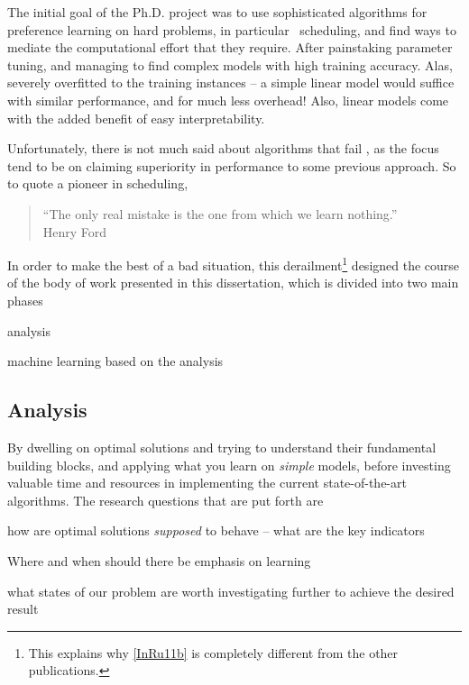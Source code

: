 The initial goal of the Ph.D. project was to use sophisticated algorithms for 
preference learning on hard problems, in particular \jsp\ scheduling, and find 
ways to mediate the computational effort that they require.
After painstaking parameter tuning, and managing to find complex models 
with high training accuracy. Alas, severely overfitted to the training 
instances -- a simple linear model would suffice with similar performance, and 
for much less overhead! Also, linear models come with the added benefit of easy 
interpretability. 

Unfortunately, there is not much said about algorithms that fail 
\citep{SmithMiles2015}, as the focus tend to be on claiming superiority in 
performance to some previous approach.
So to quote a pioneer in scheduling, 
\begin{quote}
    ``The only real mistake is the one from which we learn nothing.'' \\
    \raggedleft Henry Ford
\end{quote}
In order to make the best of a bad situation, this derailment\footnote{
    This explains why \cref{InRu11b} is completely different from the other 
    publications.} 
designed the course of the body of work presented in this dissertation, which 
is divided into two main phases
\begin{enumerate*}
    \item analysis
    \item machine learning based on the analysis
\end{enumerate*} 

\subsection*{Analysis}
By dwelling on optimal solutions and trying to understand 
their fundamental building blocks, and applying what you learn on \emph{simple} 
models, before investing valuable time and resources in implementing the 
current state-of-the-art algorithms. 
The research questions that are put forth are
\begin{enumerate*}[itemjoin={{? }}, itemjoin*={{? And ultimately, }},
    after={{?}}]
    \item how are optimal solutions \emph{supposed} to behave -- what are the 
    key indicators
    \item Where and when should there be emphasis on learning
    \item what states of our problem are worth investigating further to achieve 
    the desired result
\end{enumerate*}

